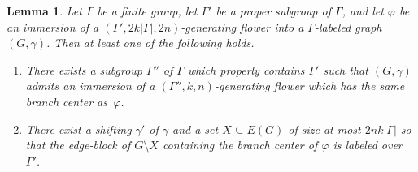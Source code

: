 \documentclass[11pt]{article}
\newtheorem{lemma}[thm]{Lemma}
\theoremstyle{definition}
\begin{document}
\begin{lemma}
\label{lem:LocalStructureStep}
    Let $\Gamma$ be a finite group, let $\Gamma'$ be a proper subgroup of $\Gamma$, and let $\varphi$ be an immersion of a $(\Gamma', 2k|\Gamma|, 2n)$-generating flower into a $\Gamma$-labeled graph $(G, \gamma)$. Then at least one of the following holds.
    \begin{enumerate}
        \item There exists a subgroup $\Gamma''$ of $\Gamma$ which properly contains $\Gamma'$ such that $(G, \gamma)$ admits an immersion of a $(\Gamma'', k, n)$-generating flower which has the same branch center as~$\varphi$.
        \item There exist a shifting $\gamma'$ of $\gamma$ and a set $X \subseteq E(G)$ of size at most $2nk|\Gamma|$ so that the edge-block of $G \setminus X$ containing the branch center of $\varphi$ is labeled over~$\Gamma'$.
    \end{enumerate}
\end{lemma}
\end{document}
